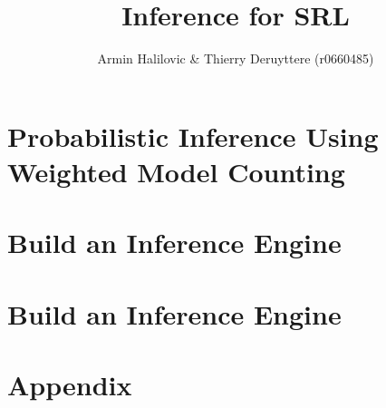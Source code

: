 \documentclass[a4paper,10pt]{report}
\title{Inference for SRL}
\author{Armin Halilovic \& Thierry Deruyttere (r0660485)}
\begin{document}
\maketitle
\chapter{Probabilistic Inference Using Weighted Model Counting}


\chapter{Build an Inference Engine}


\chapter{Build an Inference Engine}


\chapter{Appendix}

\end{document}
